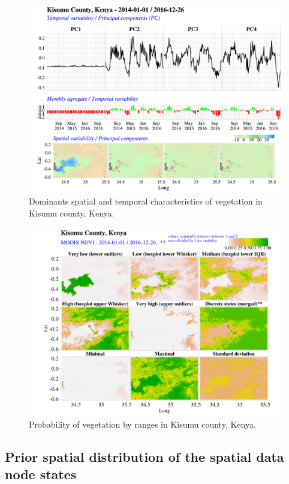 \documentclass[12pt,oneside]{article}
\begin{document}
\begin{figure}
\includegraphics[width=1\linewidth]{figures/Mapping_FBFS_NDVI_PCA_plot_Kisumu} \caption{Dominants spatial and temporal characteristics of vegetation in Kisumu county, Kenya.}\label{fig:fig9}
\end{figure}

\begin{figure}
\includegraphics[width=1\linewidth]{figures/Mapping_FBFS_vegetation_probability} \caption{Probability of vegetation by ranges in Kisumu county, Kenya.}\label{fig:fig10}
\end{figure}

\hypertarget{I.4}{%
\subsection{Prior spatial distribution of the spatial data node
states}\label{I.4}}
\end{document}
